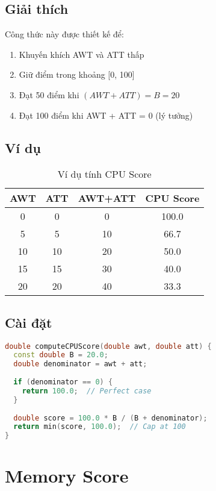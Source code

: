 \subsection{Giải thích}

Công thức này được thiết kế để:
\begin{enumerate}[leftmargin=1.5cm]
  \item Khuyến khích AWT và ATT thấp
  \item Giữ điểm trong khoảng [0, 100]
  \item Đạt 50 điểm khi $(AWT + ATT) = B = 20$
  \item Đạt 100 điểm khi AWT + ATT = 0 (lý tưởng)
\end{enumerate}

\subsection{Ví dụ}

\begin{table}[H]
\centering
\caption{Ví dụ tính CPU Score}
\begin{tabular}{cccc}
\toprule
\textbf{AWT} & \textbf{ATT} & \textbf{AWT+ATT} & \textbf{CPU Score} \\
\midrule
0 & 0 & 0 & 100.0 \\
5 & 5 & 10 & 66.7 \\
10 & 10 & 20 & 50.0 \\
15 & 15 & 30 & 40.0 \\
20 & 20 & 40 & 33.3 \\
\bottomrule
\end{tabular}
\end{table}

\subsection{Cài đặt}

\begin{lstlisting}[language=C++,caption={CPU Score Computation}]
double computeCPUScore(double awt, double att) {
  const double B = 20.0;
  double denominator = awt + att;
  
  if (denominator == 0) {
    return 100.0;  // Perfect case
  }
  
  double score = 100.0 * B / (B + denominator);
  return min(score, 100.0);  // Cap at 100
}
\end{lstlisting}

\section{Memory Score}

